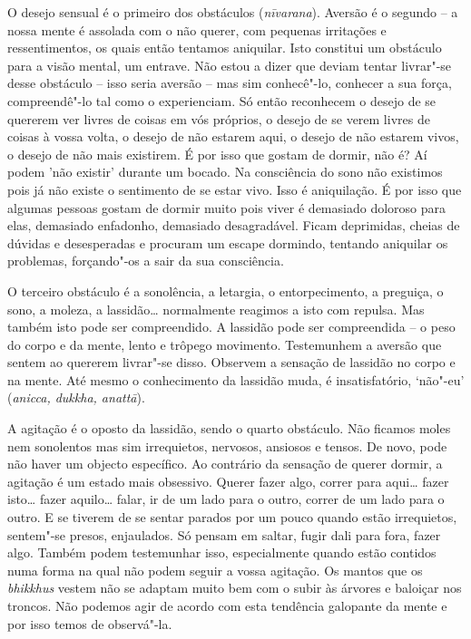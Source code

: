 O desejo sensual é o primeiro dos obstáculos (\emph{nīvarana}). Aversão
é o segundo -- a nossa mente é assolada com o não querer, com pequenas
irritações e ressentimentos, os quais então tentamos aniquilar. Isto constitui 
um obstáculo para a visão mental, um entrave. Não estou a dizer que
deviam tentar livrar"-se desse obstáculo -- isso seria aversão -- mas sim
conhecê"-lo, conhecer a sua força, compreendê"-lo tal como o experienciam.
Só então reconhecem o desejo de se quererem ver livres de coisas em vós
próprios, o desejo de se verem livres de coisas à vossa volta, o desejo
de não estarem aqui, o desejo de não estarem vivos, o desejo de não mais
existirem. É por isso que gostam de dormir, não é? Aí podem 'não existir'
durante um bocado. Na consciência do sono não existimos pois já não
existe o sentimento de se estar vivo. Isso é aniquilação. É por isso que
algumas pessoas gostam de dormir muito pois viver é demasiado doloroso
para elas, demasiado enfadonho, demasiado desagradável. Ficam
deprimidas, cheias de dúvidas e desesperadas e procuram um escape
dormindo, tentando aniquilar os problemas, forçando"-os a sair da sua
consciência.

O terceiro obstáculo é a sonolência, a letargia, o entorpecimento, a
preguiça, o sono, a moleza, a lassidão\ldots{} normalmente reagimos a
isto com repulsa. Mas também isto pode ser compreendido. A lassidão pode
ser compreendida -- o peso do corpo e da mente, lento e trôpego
movimento. Testemunhem a aversão que sentem ao quererem livrar"-se disso.
Observem a sensação de lassidão no corpo e na mente. Até mesmo o
conhecimento da lassidão muda, é insatisfatório, `não"-eu' (\emph{anicca,
  dukkha, anattā}).

A agitação é o oposto da lassidão, sendo o quarto obstáculo. Não ficamos
moles nem sonolentos mas sim irrequietos, nervosos, ansiosos e tensos.
De novo, pode não haver um objecto específico. Ao contrário da sensação
de querer dormir, a agitação é um estado mais obsessivo. Querer fazer
algo, correr para aqui\ldots{} fazer isto\ldots{} fazer
aquilo\ldots{} falar, ir de um lado para o outro, correr de um lado para
o outro. E se tiverem de se sentar parados por um pouco quando estão
irrequietos, sentem"-se presos, enjaulados. Só pensam em saltar, fugir
dali para fora, fazer algo. Também podem testemunhar isso, especialmente
quando estão contidos numa forma na qual não podem seguir a vossa
agitação. Os mantos que os \emph{bhikkhus} vestem não se adaptam muito bem
com o subir às árvores e baloiçar nos troncos. Não podemos agir de acordo 
com esta tendência galopante da mente e por isso temos de observá"-la.

